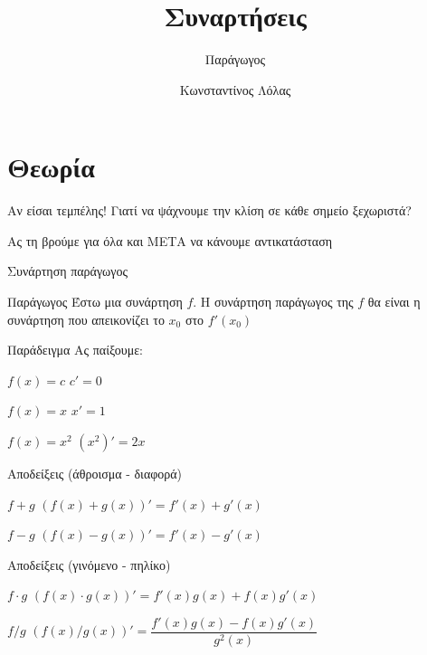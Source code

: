 \documentclass{presentation}
\title{Συναρτήσεις}
\subtitle{Παράγωγος}
\author[Λόλας]{Κωνσταντίνος Λόλας}
\institute[$10^ο$ ΓΕΛ]{$10^ο$ ΓΕΛ Θεσσαλονίκης}
\date{}
\begin{document}
\begin{frame}
    \titlepage
\end{frame}

\section{Θεωρία}
\begin{frame}{Αν είσαι τεμπέλης!}
    Γιατί να ψάχνουμε την κλίση σε κάθε σημείο ξεχωριστά? \pause

    Ας τη βρούμε για όλα και ΜΕΤΑ να κάνουμε αντικατάσταση
\end{frame}

\begin{frame}{Συνάρτηση παράγωγος}
    \begin{block}{Παράγωγος}
        Έστω μια συνάρτηση $f$. Η συνάρτηση παράγωγος της $f$ θα είναι η συνάρτηση που απεικονίζει το $x_0$ στο $f'(x_0)$
    \end{block}
\end{frame}

\begin{frame}{Παράδειγμα}
    Ας παίξουμε:
    \begin{block}{$f(x)=c$}
        $c'=0$
    \end{block} \pause

    \begin{block}{$f(x)=x$}
        $x'=1$
    \end{block} \pause

    \begin{block}{$f(x)=x^2$}
        $(x^2)'=2x$
    \end{block}
\end{frame}

\begin{frame}{Αποδείξεις (άθροισμα - διαφορά)}
    \begin{block}{$f+g$}
        $(f(x)+g(x))'=f'(x)+g'(x)$
    \end{block} \pause

    \begin{block}{$f-g$}
        $(f(x)-g(x))'=f'(x)-g'(x)$
    \end{block}
\end{frame}

\begin{frame}{Αποδείξεις (γινόμενο - πηλίκο)}
    \begin{block}{$f\cdot g$}
        $(f(x)\cdot g(x))'=f'(x)g(x)+f(x)g'(x)$
    \end{block} \pause

    \begin{block}{$f/g$}
        $(f(x)/g(x))'=\dfrac{f'(x)g(x)-f(x)g'(x)}{g^2(x)}$
    \end{block}
\end{frame}
\end{document}
